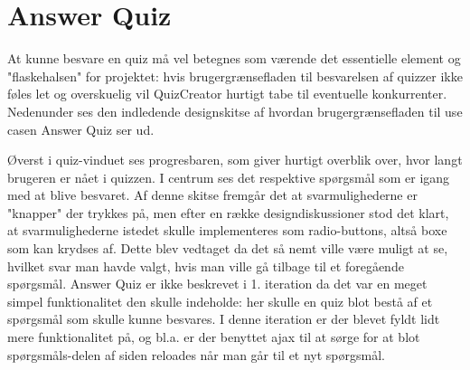\section{Answer Quiz}

At kunne besvare en quiz må vel betegnes som værende det essentielle element og "flaskehalsen" for projektet: hvis brugergrænsefladen til besvarelsen af quizzer ikke føles let og overskuelig vil QuizCreator hurtigt tabe til eventuelle konkurrenter. \\
Nedenunder ses den indledende designskitse af hvordan brugergrænsefladen til use casen Answer Quiz ser ud. \\


Øverst i quiz-vinduet ses progresbaren, som giver hurtigt overblik over, hvor langt brugeren er nået i quizzen. I centrum ses det respektive spørgsmål som er igang med at blive besvaret. Af denne skitse fremgår det at svarmulighederne er "knapper" der trykkes på, men efter en række designdiskussioner stod det klart, at svarmulighederne istedet skulle implementeres som radio-buttons, altså boxe som kan krydses af. Dette blev vedtaget da det så nemt ville være muligt at se, hvilket svar man havde valgt, hvis man ville gå tilbage til et foregående spørgsmål.
Answer Quiz er ikke beskrevet i 1. iteration da det var en meget simpel funktionalitet den skulle indeholde: her skulle en quiz blot bestå af et spørgsmål som skulle kunne besvares. 
I denne iteration er der blevet fyldt lidt mere funktionalitet på, og bl.a. er der benyttet ajax til at sørge for at blot spørgsmåls-delen af siden reloades når man går til et nyt spørgsmål. 
